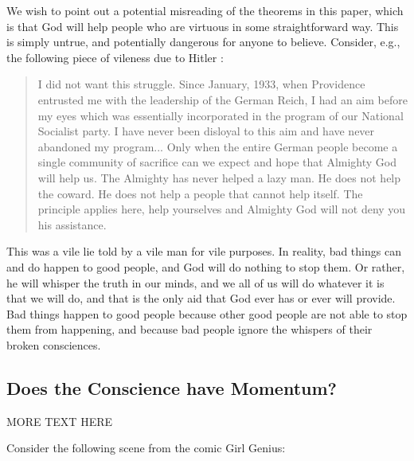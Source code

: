 \documentclass{article}
\begin{document}
We wish to point out a potential misreading of the theorems in this
paper, which is that God will help people who are virtuous in some
straightforward way. This is simply untrue, and potentially dangerous
for anyone to believe. Consider, e.g., the following piece of vileness
due to Hitler \cite{hitler}:
\begin{quote}
I did not want this struggle. Since January, 1933, when Providence
entrusted me with the leadership of the German Reich, I had an aim
before my eyes which was essentially incorporated in the program of
our National Socialist party. I have never been disloyal to this aim
and have never abandoned my program... Only when the entire German
people become a single community of sacrifice can we expect and hope
that Almighty God will help us. The Almighty has never helped a lazy
man. He does not help the coward. He does not help a people that
cannot help itself. The principle applies here, help yourselves and
Almighty God will not deny you his assistance.
\end{quote}

This was a vile lie told by a vile man for vile purposes. In reality,
bad things can and do happen to good people, and God will do nothing
to stop them. Or rather, he will whisper the truth in our minds, and
we all of us will do whatever it is that we will do, and that is the
only aid that God ever has or ever will provide. Bad things happen to
good people because other good people are not able to stop them from
happening, and because bad people ignore the whispers of their broken
consciences.

\subsection{Does the Conscience have Momentum?}

MORE TEXT HERE

Consider the following scene from the comic Girl Genius\cite{jagers}:
\end{document}
